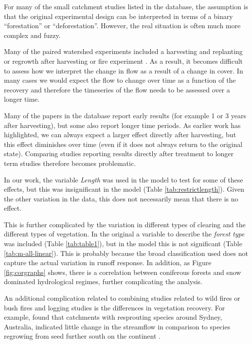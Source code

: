 \documentclass[]{elsarticle} %
\begin{document}
For many of the small catchment studies listed in the database, the assumption is that the original experimental design can be interpreted in terms of a binary ``forestation'' or ``deforestation''. However, the real situation is often much more complex and fuzzy.

Many of the paired watershed experiments included a harvesting and replanting or regrowth after harvesting or fire experiment \citep[e.g.][]{cornish1993, cornish2001, webb2013}. As a result, it becomes difficult to assess how we interpret the change in flow as a result of a change in cover. In many cases we would expect the flow to change over time as a function of the recovery \citep{jones2017} and therefore the timeseries of the flow needs to be assessed over a longer time.

Many of the papers in the database report early results (for example 1 or 3 years after harvesting), but some also report longer time periods. As earlier work \citep{cornish2001, jones2017} has highlighted, we can always expect a larger effect directly after harvesting, but this effect diminishes over time (even if it does not always return to the original state). Comparing studies reporting results directly after treatment to longer term studies therefore becomes problematic.

In our work, the variable \emph{Length} was used in the model to test for some of these effects, but this was insignificant in the model (Table \ref{tab:restrictlength}). Given the other variation in the data, this does not necessarily mean that there is no effect.

This is further complicated by the variation in different types of clearing and the different types of vegetation. In the original \citet{zhang2017} a variable to describe the \emph{forest type} was included (Table \ref{tab:table1}), but in the model this is not significant (Table \ref{tab:m-all-linear}). This is probably because the broad classification used does not capture the actual variation in runoff response. In addition, as Figure \ref{fig:corgraphs} shows, there is a correlation between coniferous forests and snow dominated hydrological regimes, further complicating the analysis.

An additional complication related to combining studies related to wild fires or bush fires and logging studies is the differences in vegetation recovery. For example, \citet{heath2014} found that catchments with resprouting species around Sydney, Australia, indicated little change in the streamflow in comparison to species regrowing from seed further south on the continent \citep{zhou2015bushfire}.
\end{document}
